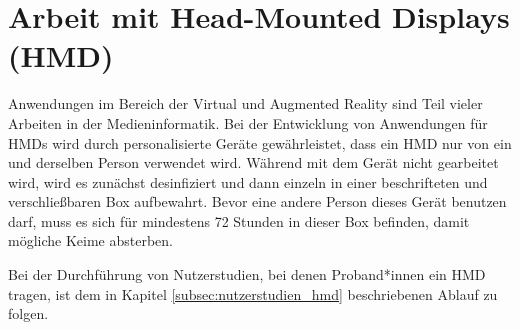 \section{Arbeit mit Head-Mounted Displays (HMD)}\label{sec:hmd}

Anwendungen im Bereich der Virtual und Augmented Reality sind Teil vieler Arbeiten in der Medieninformatik.
Bei der Entwicklung von Anwendungen für HMDs wird durch personalisierte Geräte gewährleistet, dass ein HMD nur von ein und derselben Person verwendet wird. Während mit dem Gerät nicht gearbeitet wird, wird es zunächst desinfiziert und dann einzeln in einer beschrifteten und verschließbaren Box aufbewahrt. Bevor eine andere Person dieses Gerät benutzen darf, muss es sich für mindestens 72 Stunden in dieser Box befinden, damit mögliche Keime absterben.

\medskip
\noindent
Bei der Durchführung von Nutzerstudien, bei denen Proband*innen ein HMD tragen, ist dem in Kapitel \ref{subsec:nutzerstudien_hmd} beschriebenen Ablauf zu folgen.
